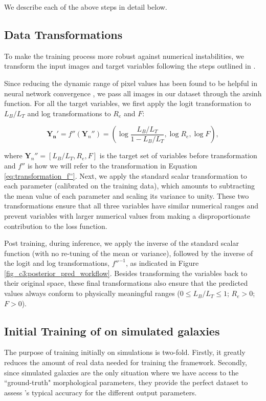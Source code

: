 We describe each of the above steps in detail below. 

\subsection{Data Transformations} \label{sec_c3:transformations}

To make the training process more robust against numerical instabilities, we transform the input images and target variables following the steps outlined in \citet{gampen_software_paper}.

Since reducing the dynamic range of pixel values has been found to be helpful in neural network convergence \citep[e.g.,][]{zanisi_21,walmsley_decals,tanaka_22}, we pass all images in our dataset through the arsinh function. For all the target variables, we first apply the logit transformation to $L_B/L_T$ and log transformations to $R_e$ and $F$: 

\begin{equation}
\boldsymbol{Y_n'} = f''(\boldsymbol{Y}_n'') = \left( \log \frac{L_B/L_T}{1 - L_B/L_T}, \log R_e, \log F \right) ,
\label{eq:transformation_f''}
\end{equation} 

\noindent
where $\boldsymbol{Y}_n'' = [{L_B/L_T,R_e,F}]$ is the target set of variables before transformation and $f''$ is how we will refer to the transformation in Equation\,\ref{eq:transformation_f''}. Next, we apply the standard scalar transformation to each parameter (calibrated on the training data), which amounts to subtracting the mean value of each parameter and scaling its variance to unity. These two transformations ensure that all three variables have similar numerical ranges and prevent variables with larger numerical values from making a disproportionate contribution to the loss function.

Post training, during inference, we apply the inverse of the standard scalar function (with no re-tuning of the mean or variance), followed by the inverse of the logit and log transformations, $f''^{-1}$, as indicated in Figure\,\ref{fig_c3:posterior_pred_workflow}. Besides transforming the variables back to their original space, these final transformations also ensure that the predicted values always conform to physically meaningful ranges ($0 \leq L_B/L_T \leq 1$; $R_e > 0$; $F > 0$).


\subsection{Initial Training of \gampen{} on simulated galaxies} \label{sec_c3:sim_training}
The purpose of training \gampen{} initially on simulations is two-fold. Firstly, it greatly reduces the amount of real data needed for training the framework. Secondly, since simulated galaxies are the only situation where we have access to the ``ground-truth" morphological parameters, they provide the perfect dataset to assess \gampen{}'s typical accuracy for the different output parameters. 

